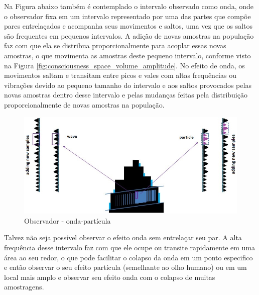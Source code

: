 Na Figura abaixo também é contemplado o intervalo observado como onda, onde o observador fixa em um intervalo representado por uma das partes que compõe pares entrelaçados e acompanha seus movimentos e saltos, uma vez que os saltos são frequentes em pequenos intervalos. A adição de novas amostras na população faz com que ela se distribua proporcionalmente para acoplar essas novas amostras, o que movimenta as amostras deste pequeno intervalo, conforme visto na Figura \ref{fig:consciousness_space_volume_amplitude}. No efeito de onda, os movimentos saltam e transitam entre picos e vales com altas frequências ou vibrações devido ao pequeno tamanho do intervalo e aos saltos provocados pelas novas amostras dentro desse intervalo e pelas mudanças feitas pela distribuição proporcionalmente de novas amostras na população.
	\begin{figure}[H]
	\caption{Observador - onda-partícula}
	\label{fig:consciousness_space_wave-particle}
	\centering
	\includegraphics[scale=.55]{sections/images/consciousness_space_wave-particle.jpg}
	\end{figure}

Talvez não seja possível observar o efeito onda sem entrelaçar seu par. A alta frequência desse intervalo faz com que ele ocupe ou transite rapidamente em uma área ao seu redor, o que pode facilitar o colapso da onda em um ponto especifico e então observar o seu efeito partícula (semelhante ao olho humano) ou em um local mais amplo e observar seu efeito onda com o colapso de muitas amostragens.
